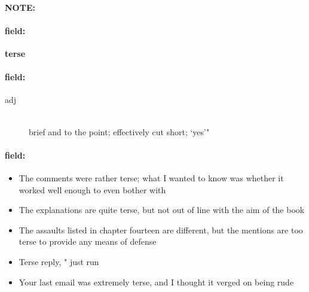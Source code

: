\documentclass[12pt]{article}
\newenvironment{note}{\paragraph{NOTE:}}{}
\newenvironment{field}{\paragraph{field:}}{}
\begin{document}
\begin{note}
\begin{field}
\textbf{\large terse}
\end{field}


\begin{field}
\begin{description}
\item[adj] \hfill \\ 
brief and to the point; effectively cut short; `yes'"

\end{description}
\end{field}

\begin{field}
\begin{itemize}
\item The comments were rather terse; what I wanted to know was whether it worked well enough to even bother with
\item The explanations are quite terse, but not out of line with the aim of the book
\item The assaults listed in chapter fourteen are different, but the mentions are too terse to provide any means of defense
\item Terse reply, " just run
\item Your last email was extremely terse, and I thought it verged on being rude
\end{itemize}
\end{field}
\end{note}
\end{document}
